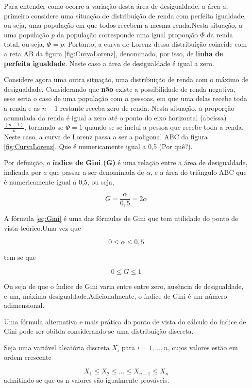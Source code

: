 \documentclass[
]{book}
\begin{document}
Para entender como ocorre a variação desta área de desigualdade, a área \(a\), primeiro considere uma situação de distribuição de renda com perfeita igualdade, ou seja, uma população em que todos recebem a mesma renda.Nesta situação, a uma população \(p\) da população corresponde uma igual proporção \(\Phi\) da renda total, ou seja, \(\Phi = p\). Portanto, a curva de Lorenz dessa distribuição coincide com a reta AB da figura \ref{fig:CurvaLorenz}, denominado, por isso, de \textbf{linha de perfeita igualdade}. Neste caso a área de desigualdade é igual a zero.

Considere agora uma outra situação, uma distribuição de renda com o máximo de desigualdade. Considerando que \textbf{não} existe a possibilidade de renda negativa, esse seria o caso de uma população com \(n\) pessoas, em que uma delas recebe toda a renda e as \(n-1\) restante receba zero de renda. Nesta situação, a proporção acumulada da renda é igual a zero até o ponto do eixo horizontal (abcissa) \(\frac{(n-1)}{n}\), tornando-se \(\Phi = 1\) quando se se inclui a pessoa que recebe toda a renda. Neste caso, a curva de Lorenz passa a ser a poligonal ABC da figura \ref{fig:CurvaLorenz}. Que é numericamente igual a 0,5 (Por quê?).

Por definição, o \textbf{índice de Gini (G)} é uma relação entre a área de desigualdade, indicada por \(a\) que passar a ser denominada de \(\alpha\), e a área do triângulo ABC que é numericamente igual a 0,5, ou seja,

\[
G = \dfrac{\alpha}{0,5} = 2\alpha
\label{eq:Gini}
\]

A fórmula \eqref{eq:Gini} é uma das fórmulas de Gini que tem utilidade do ponto de vista teórico.Uma vez que

\[
0 \leq \alpha \leq 0,5
\]

tem se que

\[
0 \leq G \leq 1
\]

Ou seja de que o índice de Gini varia entre entre zero, ausência de desigualdade, e um, máxima desigualdade.Adicionalmente, o índice de Gini é um número adimensional.

Uma fórmula alternativa e mais prática do ponto de vista do cálculo do índice de Gini pode ser obitda considerando-se uma distribuição discreta.

Seja uma variável aleatória discreta \(X_i\) para \(i=1,\ldots,n\), cujos valores estão em ordem crescente

\[
X_1\leq X_2 \leq \ldots \leq X_{n-1} \leq X_n
\]
admitindo-se que os n valores são igualmente prováveis.
\end{document}
